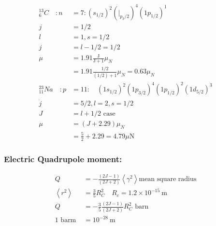 \begin{answer}
	\begin{align*}
	{ }^{13}_{6}C\quad :n&=7:\left(s_{1 / 2}\right)^{2}\left(\left.\right|_{p_{3} / 2}\right)^{4}\left(1 p_{1 / 2}\right)^{1}\\
	j&=1 / 2 \\
	l&=1, s=1 / 2\\
	j&=l-1 / 2=1 / 2\\
	\mu&=1.91 \frac{\mathrm{J}}{\mathrm{J}+1} \mu_{N}\\
	&=1.91 \frac{1 / 2}{(1 / 2)+1} \mu_{N}=0.63 \mu_{N}\\
	{}^{23}_{11}Na\quad  : p&=11: \quad\left(1 s_{1 / 2}\right)^{2}\left(1 p_{3 / 2}\right)^{4}\left(1 p_{1 / 2}\right)^{2}\left(1 d_{5 / 2}\right)^{3}\\
	\dot{j}&=5 / 2, l=2, s=1 / 2\\
	J&=l+1 / 2 \text { case }\\
	\mu&=(J+2.29) \mu_{N}\\
	&=\frac{5}{2}+2.29=4.79 \mu \mathrm{N}
	\end{align*}
\end{answer}
\subsubsection{Electric Quadrupole moment:}
\begin{align*}
Q&=-\frac{(2 J-1)}{(2 J+2)}\left\langle\gamma^{2}\right\rangle \text{mean square radius}\\
\left\langle r^{2}\right\rangle&=\frac{3}{5} R_{C}^{2}\quad R_{c}=1.2 \times 10^{-15} \mathrm{~m}\\
Q&=-\frac{3}{5} \frac{(2 J-1)}{(2 J+2)} R_{C}^{2}\text{ barn}\\
1 \text { barm }&=10^{-28} \mathrm{~m}
\end{align*}
